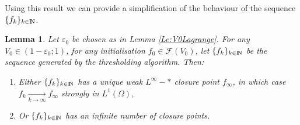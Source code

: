 \documentclass{article}
\newcommand{\N}{\textnormal{I\kern-0.21emN}}
\def\e{{\varepsilon}}
\newtheorem{lemma}[material]{Lemma}
\def\O{{\Omega}}
\numberwithin{equation}{section}
\begin{document}
Using this result we can provide a simplification of the behaviour of the sequence $\{f_k\}_{k\in \N}$.
\begin{lemma}\label{Le:MultipleClosurePoints}
Let $\e_0$ be chosen as in Lemma \ref{Le:V0Lagrange}. For any $V_0\in (1-\e_0;1)$, for any initialisation $f_0\in \mathcal F(V_0)$, let $\{f_k\}_{k\in \N}$ be the sequence generated by the thresholding algorithm. Then:
\begin{enumerate}
\item Either $\{f_k\}_{k\in \N}$ has a unique weak $L^\infty-*$ closure point $f_\infty$, in which case $f_k\underset{k\to \infty}\rightarrow f_\infty$ strongly in $L^1(\O)$,
\item Or $\{f_k\}_{k\in \N}$ has an infinite number of closure points.\end{enumerate}
\end{lemma}
\end{document}
